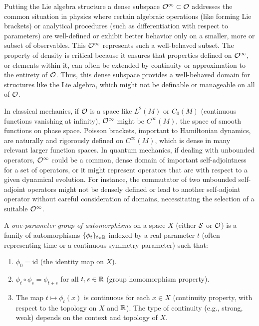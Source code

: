 Putting the Lie algebra structure a dense subspace $\mathcal{O}^{\infty} \subset \mathcal{O}$ addresses the common situation in physics where certain algebraic operations (like forming Lie brackets) or analytical procedures (such as differentiation with respect to parameters) are well-defined or exhibit better behavior only on a smaller, more  or  subset of observables. This $\mathcal{O}^{\infty}$ represents such a well-behaved subset. The property of density is critical because it ensures that properties defined on $\mathcal{O}^{\infty}$, or elements within it, can often be extended by continuity or approximation to the entirety of $\mathcal{O}$. Thus, this dense subspace provides a well-behaved domain for structures like the Lie algebra, which might not be definable or manageable on all of $\mathcal{O}$.

\begin{example}
In classical mechanics, if $\mathcal{O}$ is a space like $L^2(M)$ or $C_0(M)$ (continuous functions vanishing at infinity), $\mathcal{O}^{\infty}$ might be $C^\infty(M)$, the space of smooth functions on phase space. Poisson brackets, important to Hamiltonian dynamics, are naturally and rigorously defined on $C^\infty(M)$, which is dense in many relevant larger function spaces. In quantum mechanics, if dealing with unbounded operators, $\mathcal{O}^{\infty}$ could be a common, dense domain of important self-adjointness for a set of operators, or it might represent operators that are  with respect to a given dynamical evolution. For instance, the commutator of two unbounded self-adjoint operators might not be densely defined or lead to another self-adjoint operator without careful consideration of domains, necessitating the selection of a suitable $\mathcal{O}^{\infty}$.
\end{example}

\begin{definition}
A \textit{one-parameter group of automorphisms} on a space $X$ (either $\mathcal{S}$ or $\mathcal{O}$) is a family of automorphisms $\{\phi_t\}_{t \in \mathbb{R}}$ indexed by a real parameter $t$ (often representing time or a continuous symmetry parameter) such that:
\begin{enumerate}
    \item $\phi_0 = \text{id}$ (the identity map on $X$).
    \item $\phi_t \circ \phi_s = \phi_{t+s}$ for all $t, s \in \mathbb{R}$ (group homomorphism property).
    \item The map $t \mapsto \phi_t(x)$ is continuous for each $x \in X$ (continuity property, with respect to the topology on $X$ and $\mathbb{R}$). The type of continuity (e.g., strong, weak) depends on the context and topology of $X$.
\end{enumerate}
\end{definition}

